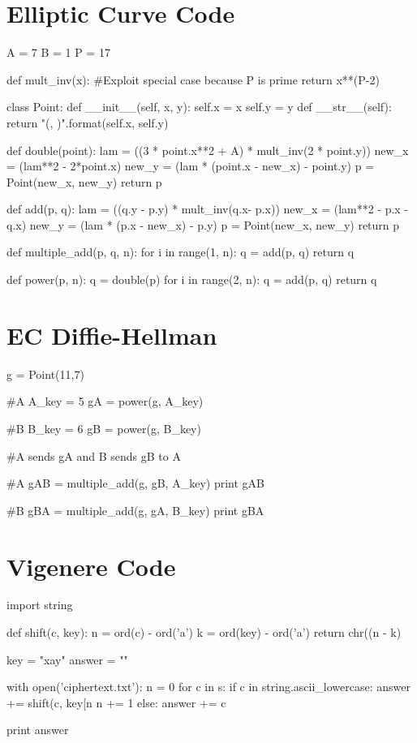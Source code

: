 \documentclass[11pt,a4paper,twoside]{article}
\begin{document}
\section{Elliptic Curve Code}
\label{ECC}
\begin{python}
A = 7
B = 1
P = 17

def mult_inv(x):
    #Exploit special case because P is prime
    return x**(P-2) %

class Point:
    def __init__(self, x, y):
        self.x = x
        self.y = y
    def __str__(self):
        return "({}, {})".format(self.x, self.y)
    
def double(point):
    lam = ((3 * point.x**2 + A) * mult_inv(2 * point.y)) %
    new_x = (lam**2 - 2*point.x) %
    new_y = (lam * (point.x - new_x) - point.y) %
    p = Point(new_x, new_y)
    return p

def add(p, q):
    lam = ((q.y - p.y) * mult_inv(q.x- p.x)) %
    new_x = (lam**2 - p.x - q.x) %
    new_y = (lam * (p.x - new_x) - p.y) %
    p = Point(new_x, new_y)
    return p

def multiple_add(p, q, n):
    for i in range(1, n):
        q = add(p, q)
    return q

def power(p, n):
    q = double(p)
    for i in range(2, n):
        q = add(p, q)
    return q
\end{python}
\vfill
\pagebreak

\section{EC Diffie-Hellman}
\label{ECDH}
\begin{python}
g = Point(11,7)

#A 
A_key = 5
gA = power(g, A_key)

#B 
B_key = 6
gB = power(g, B_key)

#A sends gA and B sends gB to A

#A 
gAB = multiple_add(g, gB, A_key)
print gAB

#B 
gBA = multiple_add(g, gA, B_key)
print gBA
\end{python}

\section{Vigenere Code}
\label{vig_code}
\begin{python}
import string

def shift(c, key):
    n = ord(c) - ord('a')
    k = ord(key) - ord('a')
    return chr((n - k) %

key = "xay"
answer = ""

with open('ciphertext.txt'):
    n = 0
    for c in s:
        if c in string.ascii_lowercase:
            answer += shift(c, key[n%
            n += 1
        else:
            answer += c
        
print answer
\end{python}
\end{document}
